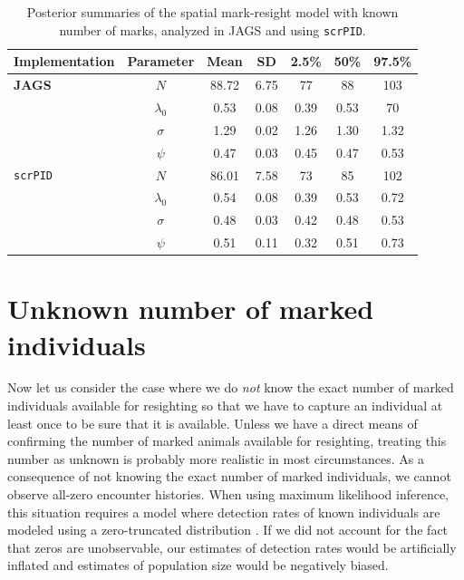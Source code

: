 \begin{table}
\label{partialID.tab.knownm}
\centering
  \caption{Posterior summaries of the spatial mark-resight model with known number of marks, analyzed in JAGS and using {\tt scrPID}.}
  \begin{tabular}{lcccccc}
             \hline
  Implementation & Parameter   & Mean  & SD   & 2.5\% & 50\% & 97.5\% \\
           \hline
{\bf JAGS}       & $N$         & 88.72 & 6.75 & 77    & 88   & 103    \\
		 & $\lambda_0$ & 0.53  & 0.08 & 0.39  & 0.53 & 70     \\
		 & $\sigma$    & 1.29  & 0.02 & 1.26  & 1.30 & 1.32   \\
		 & $\psi$      & 0.47  & 0.03 & 0.45  & 0.47 & 0.53   \\
		\hline
{\tt scrPID}     & $N$         & 86.01 & 7.58 & 73    & 85   & 102    \\
		 & $\lambda_0$ & 0.54  & 0.08 & 0.39  & 0.53 & 0.72   \\
		 & $\sigma$    & 0.48  & 0.03 & 0.42  & 0.48 & 0.53   \\
		 & $\psi$      & 0.51  & 0.11 & 0.32  & 0.51 & 0.73   \\
			\hline
  \end{tabular}
\end{table}


\section {Unknown number of marked individuals}
\label{partialID.sec.unknown}
Now let us consider the case where we do {\it not} know the exact
number of marked individuals available for resighting so that we have
to capture an individual at least once to be sure that it is
available. Unless we have a direct means of confirming the number of
marked animals available for resighting, treating this number as
unknown is probably more realistic in most circumstances. As a
consequence of not knowing the exact number of marked individuals, we
cannot observe all-zero encounter histories. When using maximum
likelihood inference, this situation requires a model where detection
rates of known individuals are modeled using a zero-truncated
distribution \citep{mcclintock_etal:2009biometrics}. If we did not
account for the fact that zeros are unobservable, our estimates of
detection rates would be artificially inflated and estimates of
population size would be negatively biased.

